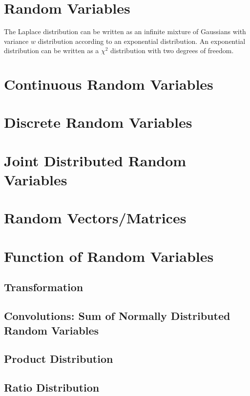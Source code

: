 \section{Random Variables}
The Laplace distribution can be written as an infinite mixture of Gaussians with variance $w$ distribution according to an exponential distribution. An exponential distribution can be written as a $\chi^2$ distribution with two degrees of freedom.
\section{Continuous Random Variables}
\section{Discrete Random Variables}
\section{Joint Distributed Random Variables}
\section{Random Vectors/Matrices}
\section{Function of Random Variables}
\subsection{Transformation}
\subsection{Convolutions: Sum of Normally Distributed Random Variables}
\subsection{Product Distribution}
\subsection{Ratio Distribution} 